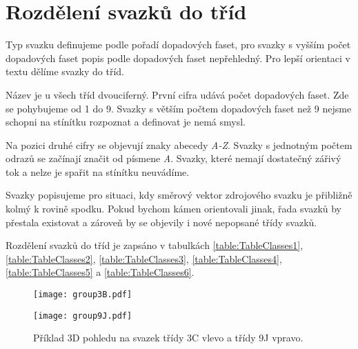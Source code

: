 \section{Rozdělení svazků do tříd}
\label{sec:tridy}
Typ svazku definujeme podle pořadí dopadových faset, pro svazky s vyšším počet dopadových faset popis podle dopadových faset nepřehledný. Pro lepší orientaci v textu  dělíme svazky do tříd. 

Název je u všech tříd dvouciferný. První cifra udává počet dopadových faset. Zde se pohybujeme od 1 do 9. Svazky s větším počtem dopadových faset než 9 nejsme schopni na stínítku rozpoznat a definovat je nemá smysl. 
  
 Na pozici druhé cifry se objevují znaky abecedy \textit{A-Z}. Svazky s jednotným počtem odrazů se začínají značit od písmene \textit{A}. Svazky, které nemají dostatečný zářivý tok a nelze je spařit na stínítku neuvádíme. 
  
  Svazky popisujeme pro situaci, kdy směrový vektor zdrojového svazku je přibližně kolmý k rovině spodku. Pokud bychom kámen orientovali jinak, řada svazků by přestala existovat a zároveň by se objevily i nové nepopsané třídy svazků. 
  
  Rozdělení svazků do tříd je zapsáno v tabulkách \ref{table:TableClasses1}, \ref{table:TableClasses2}, \ref{table:TableClasses3}, \ref{table:TableClasses4}, \ref{table:TableClasses5} a \ref{table:TableClasses6}.
 
 \begin{figure}[ht]
\centering
\begin{minipage}[c]{0.325\textwidth}
\texttt{[image: group3B.pdf]}
\end{minipage}
\begin{minipage}[c]{0.325\textwidth}
\texttt{[image: group9J.pdf]}
\end{minipage}
\caption[Svazky třídy 3C a 9J.]{Příklad 3D pohledu na svazek třídy 3C vlevo a třídy 9J vpravo.}
\label{fig:modelClass3D1}
\end{figure}
 
